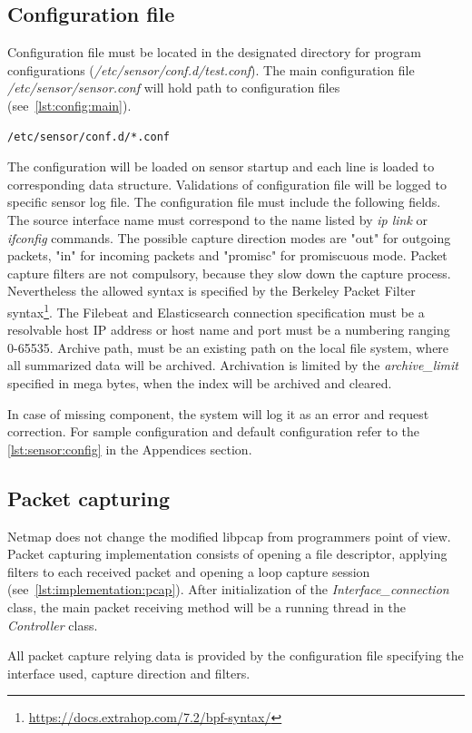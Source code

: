 \documentclass[12pt,a4paper,twoside]{report}
\begin{document}
		\subsection{Configuration file} \label{implementation:sensor:config}
			Configuration file must be located in the designated directory for program configurations (\emph{/etc/sensor/conf.d/test.conf}). The main configuration file \emph{/etc/sensor/sensor.conf} will hold path to configuration files (see~\autoref{lst:config:main}).
			\begin{lstlisting}[language=bash, style=appendix, caption=Contents of main configuration file, label=lst:config:main]
/etc/sensor/conf.d/*.conf
			\end{lstlisting}				
			The configuration will be loaded on sensor startup and each line is loaded to corresponding data structure. Validations of configuration file will be logged to specific sensor log file. The configuration file must include the following fields. The source interface name must correspond to the name listed by \emph{ip link} or \emph{ifconfig} commands. The possible capture direction modes are "out" for outgoing packets, "in" for incoming packets and "promisc" for promiscuous mode. Packet capture filters are not compulsory, because they slow down the capture process. Nevertheless the allowed syntax is specified by the Berkeley Packet Filter syntax\footnote{\url{https://docs.extrahop.com/7.2/bpf-syntax/}}. The Filebeat and Elasticsearch connection specification must be a resolvable host IP address or host name and port must be a numbering ranging 0-65535. Archive path, must be an existing path on the local file system, where all summarized data will be archived. Archivation is limited by the \emph{archive\_limit} specified in mega bytes, when the index will be archived and cleared. \par
			In case of missing component, the system will log it as an error and request correction. For sample configuration and default configuration refer to the \autoref{lst:sensor:config} in the Appendices section.
		\subsection{Packet capturing} \label{implementation:sensor:cap}
			Netmap does not change the modified libpcap from programmers point of view. Packet capturing implementation consists of opening a file descriptor, applying filters to each received packet and opening a loop capture session (see~\autoref{lst:implementation:pcap}). After initialization of the \emph{Interface\_connection} class, the main packet receiving method will be a running thread in the \emph{Controller} class.
			\par
			All packet capture relying data is provided by the configuration file specifying the interface used, capture direction and filters.
\end{document}
